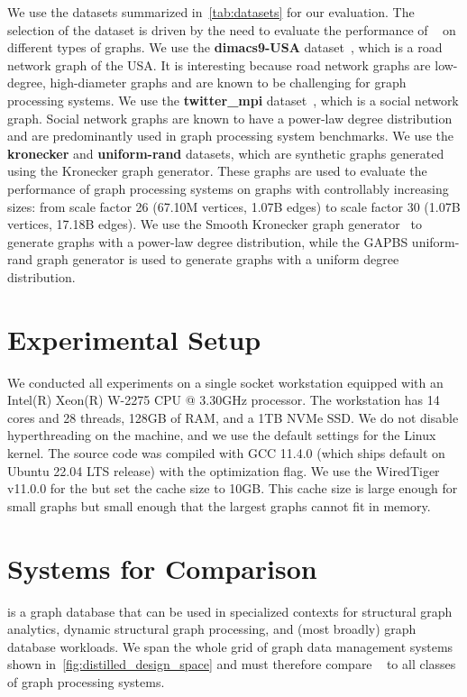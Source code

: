 We use the datasets summarized in~\autoref{tab:datasets} for our evaluation.
The selection of the dataset is driven by the need to evaluate the performance of ~\project{} on different types of graphs.
We use the \textbf{dimacs9-USA} dataset~\cite{FullUSA92:online}, which is a road network graph of the USA. It is interesting because road network graphs are low-degree, high-diameter graphs and are known to be challenging for graph processing systems.
We use the \textbf{twitter\_mpi} dataset~\cite{icwsm10cha}, which is a social network graph. Social network graphs are known to have a power-law degree distribution and are predominantly used in graph processing system benchmarks.
We use the \textbf{kronecker} and \textbf{uniform-rand} datasets, which are synthetic graphs generated using the Kronecker graph generator.
These graphs are used to evaluate the performance of graph processing systems on graphs with controllably increasing sizes: from scale factor 26 (67.10M vertices, 1.07B edges) to scale factor 30 (1.07B vertices, 17.18B edges).
We use the Smooth Kronecker graph generator~\cite{anand2020smooth} to generate graphs with a power-law degree distribution, while the \ac{GAPBS} uniform-rand graph generator is used to generate graphs with a uniform degree distribution.

\section{Experimental Setup}
\label{eval:experimental_setup}
We conducted all experiments on a single socket workstation equipped with an Intel(R) Xeon(R) W-2275 CPU @ 3.30GHz processor.
The workstation has 14 cores and 28 threads, 128GB of RAM, and a 1TB NVMe SSD.
We do not disable hyperthreading on the machine, and we use the default settings for the Linux kernel.
The source code was compiled with GCC 11.4.0 (which ships default on Ubuntu 22.04 LTS release) with the  optimization flag.
We use the WiredTiger v11.0.0 for the \project{} but set the \wt{} cache size to 10GB. This cache size is large enough for small graphs but small enough that the largest graphs cannot fit in memory.

\section{Systems for Comparison}
\label{eval:systems_for_comparison}

\project{} is a graph database that can be used in specialized contexts for structural graph analytics, dynamic structural graph processing, and (most broadly) graph database workloads.
We span the whole grid of graph data management systems shown in~\autoref{fig:distilled_design_space} and must therefore compare ~\project{} to all classes of graph processing systems.

